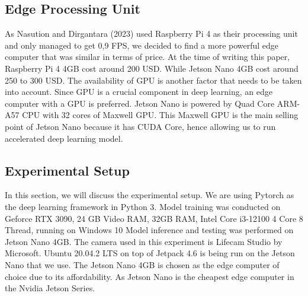 \documentclass[conference]{IEEEtran}
\begin{document}
\subsection{Edge Processing Unit}
As Nasution and Dirgantara (2023) used Raspberry Pi 4 as their processing unit and only managed to get 0,9 FPS, we decided to find a more powerful edge computer that was similar in terms of price. At the time of writing this paper, Raspberry Pi 4 4GB cost around 200 USD. While Jetson Nano 4GB cost around 250 to 300 USD.
The availability of GPU is another factor that needs to be taken into account. Since GPU is a crucial component in deep learning, an edge computer with a GPU is preferred.
Jetson Nano is powered by Quad Core ARM-A57 CPU with 32 cores of Maxwell GPU. This Maxwell GPU is the main selling point of Jetson Nano because it has CUDA Core, hence allowing us to run accelerated deep learning model.

\subsection{Experimental Setup}
In this section, we will discuss  the experimental setup. We are using Pytorch as the deep learning framework in Python  3.
Model training was conducted on Geforce RTX 3090, 24 GB Video RAM, 32GB RAM, Intel Core i3-12100 4 Core 8 Thread, running on Windows 10
Model inference and testing was performed on Jetson Nano 4GB. The camera used in this experiment is Lifecam Studio by Microsoft.
Ubuntu 20.04.2 LTS on top of Jetpack 4.6 is being run on the Jetson Nano that we use. The Jetson Nano 4GB is chosen as the edge computer of choice due to its affordability. As Jetson Nano is the cheapest edge computer in the Nvidia Jetson Series.
\end{document}
